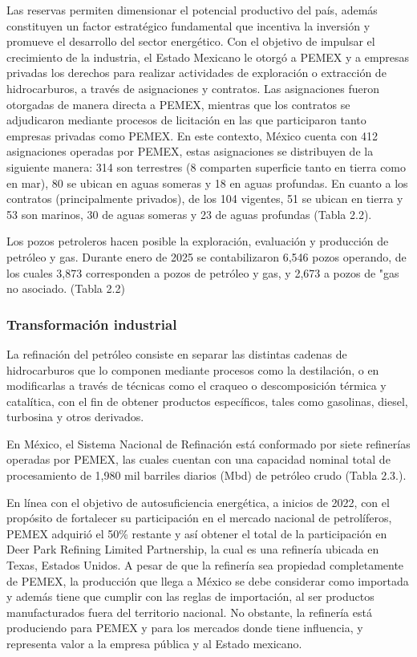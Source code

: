 \documentclass{sener2025}
\begin{document}
Las reservas permiten dimensionar el potencial productivo del país, además constituyen un factor estratégico fundamental que incentiva la inversión y promueve el desarrollo del sector energético. Con el objetivo de impulsar el crecimiento de la industria, el Estado Mexicano le otorgó a PEMEX y a empresas privadas los derechos para realizar actividades de exploración o extracción de hidrocarburos, a través de asignaciones y contratos. Las asignaciones fueron otorgadas de manera directa a PEMEX, mientras que los contratos se adjudicaron mediante procesos de licitación en las que participaron tanto empresas privadas como PEMEX. En este contexto, México cuenta con 412 asignaciones operadas por PEMEX, estas asignaciones se distribuyen de la siguiente manera: 314 son terrestres (8 comparten superficie tanto en tierra como en mar), 80 se ubican en aguas someras y 18 en aguas profundas. En cuanto a los contratos (principalmente privados), de los 104 vigentes, 51 se ubican en tierra y 53 son marinos, 30 de aguas someras y 23 de aguas profundas (Tabla 2.2).

Los pozos petroleros hacen posible la exploración, evaluación y producción de petróleo y gas. Durante enero de 2025 se contabilizaron 6,546 pozos operando, de los cuales 3,873 corresponden a pozos de petróleo y gas, y 2,673 a pozos de "gas no asociado. (Tabla 2.2)


\subsubsection{Transformación industrial}

La refinación del petróleo consiste en separar las distintas cadenas de hidrocarburos que lo componen mediante procesos como la destilación, o en modificarlas a través de técnicas como el craqueo o descomposición térmica y catalítica, con el fin de obtener productos específicos, tales como gasolinas, diesel, turbosina y otros derivados.

En México, el Sistema Nacional de Refinación está conformado por siete refinerías operadas por PEMEX, las cuales cuentan con una capacidad nominal total de procesamiento de 1,980 mil barriles diarios (Mbd) de petróleo crudo (Tabla 2.3.).

En línea con el objetivo de autosuficiencia energética, a inicios de 2022, con el propósito de fortalecer su participación en el mercado nacional de petrolíferos, PEMEX adquirió el 50\% restante y así obtener el total de la participación en Deer Park Refining Limited Partnership, la cual es una refinería ubicada en Texas, Estados Unidos. A pesar de que la refinería sea propiedad completamente de PEMEX, la producción que llega a México se debe considerar como importada y además tiene que cumplir con las reglas de importación, al ser productos manufacturados fuera del territorio nacional. No obstante, la refinería está produciendo para PEMEX y para los mercados donde tiene influencia, y representa valor a la empresa pública y al Estado mexicano.
\end{document}

